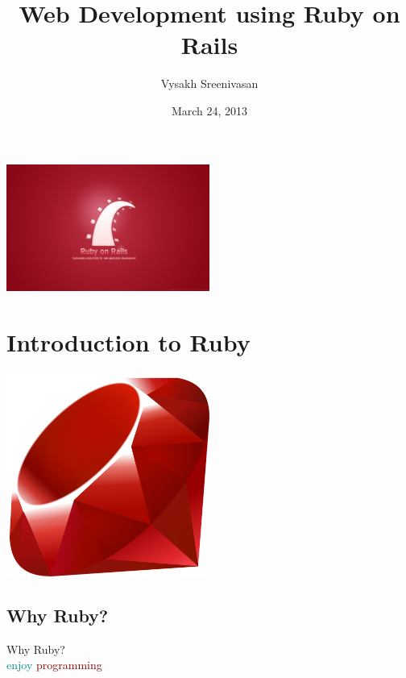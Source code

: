 \documentclass[xcolor=svgnames]{beamer}
\title{Web Development using Ruby on Rails}
\author{Vysakh Sreenivasan}
\institute[vysakh.quora.com]{
  Submify.com\\
  vysakh.quora.com\\[1ex]
  \texttt{vysakh0 - twitter/facebook} 
}
\date{March 24, 2013}
\newcommand\Fontvi{\fontsize{30}{7.2}\selectfont}
\begin{document}
\begin{frame}[plain]
  \titlepage
  \begin{center}
    \includegraphics[width=0.5\textwidth]{ruby-on-rails1.jpg}
  \end{center}
\end{frame}
\section{Introduction to Ruby}
\begin{frame}
\transwipe
  \begin{center}
    \includegraphics[width=0.5\textwidth]{ruby.png}
  \end{center}
\end{frame}
\subsection{Why Ruby?}
\begin{frame}{Why Ruby?}
\transwipe
  \Fontvi
   \\
  \bigskip
  \bigskip
  \hspace*{3.5cm}\textcolor{DarkCyan}{enjoy} \textcolor{Maroon}{programming} \\
  \bigskip
  \bigskip
\end{frame}
\end{document}
